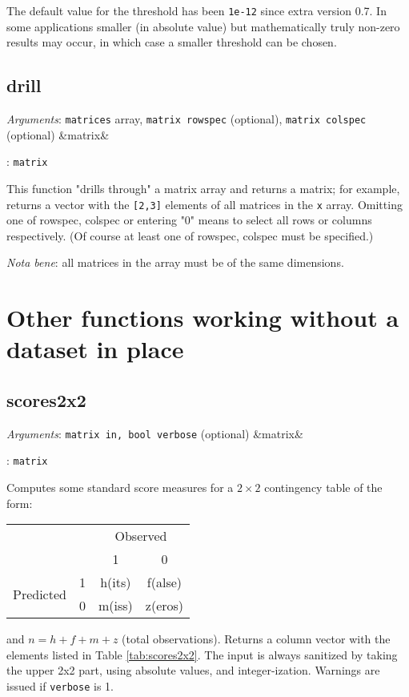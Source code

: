 \documentclass[11pt,english]{article}
\providecommand{\tabularnewline}{\\}
\newcommand{\ArgRet}[2]{%
  {\it Arguments}: {#1}%
  \ifx&#2&%
  \else
  \par\smallskip\noindent {\it Return type}: \texttt{#2}
  \fi%
  \par\medskip\par%
  }
\begin{document}
The default value for the threshold has been \texttt{1e-12} since extra 
version 0.7. In some applications smaller (in absolute value) but mathematically
truly non-zero results may occur, in which case a smaller threshold can be chosen.  

\subsection{drill}

\ArgRet{\texttt{matrices} array, \texttt{matrix rowspec} (optional), 
  \texttt{matrix colspec} (optional)}{matrix}

This function "drills through" a matrix array and returns a matrix;
for example,  returns a vector with the
\texttt{[2,3]} elements of all matrices in the \texttt{x}
array. Omitting one of rowspec, colspec or entering "0" means to
select all rows or columns respectively.  (Of course at least one of
rowspec, colspec must be specified.)

\emph{Nota bene}: all matrices in the array must be of the same dimensions.


\section{Other functions working without a dataset in place}

\subsection{scores2x2}

\ArgRet{\texttt{matrix in, bool verbose} (optional)}{matrix}

Computes some standard score measures for a $2\times 2$ contingency
table of the form:

\begin{center}
\begin{tabular}{cccc}
\toprule 
 &  & \multicolumn{2}{c}{Observed}\tabularnewline
 &  & 1 & 0\tabularnewline
\midrule
\multirow{2}{*}{Predicted} & 1 & h(its) & f(alse)\tabularnewline
 & 0 & m(iss) & z(eros)\tabularnewline
\bottomrule
\end{tabular}
\end{center}

\noindent and $n=h+f+m+z$ (total observations). Returns a column vector with the
elements listed in Table \ref{tab:scores2x2}. The input is always
sanitized by taking the upper 2x2 part, using absolute values, and
integer-ization. Warnings are issued if \texttt{verbose} is 1.
\end{document}

